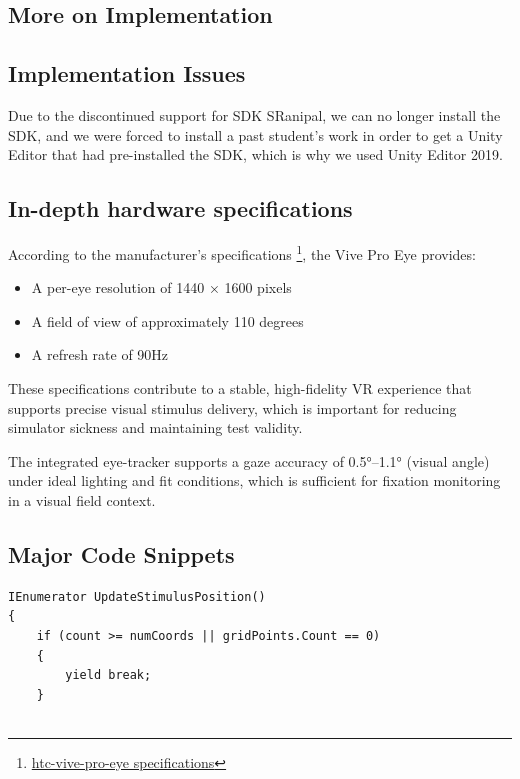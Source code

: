 \documentclass{l4proj}
\begin{document}
\begin{appendices}
\clearpage
\section{More on Implementation}

\subsection{Implementation Issues}
\label{SDK}
Due to the discontinued support for SDK SRanipal, we can no longer install the SDK, and we were forced to install a past student's work in order to get a Unity Editor that had pre-installed the SDK, which is why we used Unity Editor 2019. 

\subsection{In-depth hardware specifications}
\label{hardware}
According to the manufacturer's specifications \footnote{\href{https://www.tobii.com/products/integration/xr-headsets/device-integrations/htc-vive-pro-eye}{htc-vive-pro-eye specifications}}, the Vive Pro Eye provides:

\begin{itemize}
    \item A per-eye resolution of 1440 × 1600 pixels
 
    \item A field of view of approximately 110 degrees

    \item A refresh rate of 90Hz
\end{itemize}

These specifications contribute to a stable, high-fidelity VR experience that supports precise visual stimulus delivery, which is important for reducing simulator sickness and maintaining test validity.

The integrated eye-tracker supports a gaze accuracy of 0.5°–1.1° (visual angle) under ideal lighting and fit conditions, which is sufficient for fixation monitoring in a visual field context.



\subsection{Major Code Snippets}
\begin{lstlisting}[language={[Sharp]C}, caption = {Function that updates the stimulus coordinate} ]
    IEnumerator UpdateStimulusPosition()
{   
    if (count >= numCoords || gridPoints.Count == 0)
    {
        yield break;
    }


\end{lstlisting}
\end{appendices}
\end{document}
